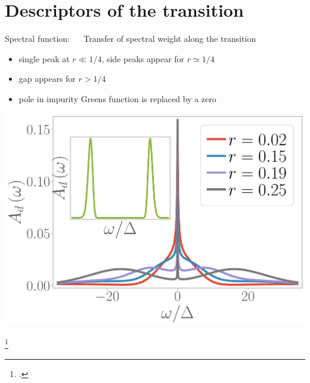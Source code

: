 \documentclass[11pt,aspectratio=169]{beamer}
\begin{document}
\section{Descriptors of the transition}
\begin{frame}{Spectral function:~ ~ Transfer of spectral weight along the transition}
\hspace*{-45pt}
\begin{minipage}{0.5\textwidth}
	\begin{itemize}
		\item single peak at \(r \ll 1/4\), side peaks appear for \(r \simeq 1/4\)\\[20pt]
		\item gap appears for \(r > 1/4\)\\[20pt]
 		\item pole in impurity Greens function is replaced by a zero
	\end{itemize}
\end{minipage}
\begin{minipage}{0.49\textwidth}
	\includegraphics[width=1.2\textwidth]{figures/Add.pdf}
\end{minipage}

\footcite{hewson1993}
\end{frame}
\end{document}
